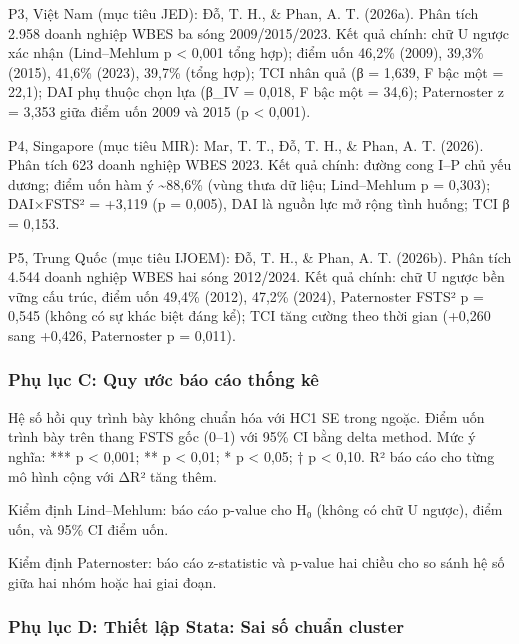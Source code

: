 \documentclass[
  a4paper,
  13pt]{extreport}
\begin{document}
P3, Việt Nam (mục tiêu JED): Đỗ, T. H., \& Phan, A. T. (2026a). Phân
tích 2.958 doanh nghiệp WBES ba sóng 2009/2015/2023. Kết quả chính: chữ
U ngược xác nhận (Lind--Mehlum p \textless{} 0,001 tổng hợp); điểm uốn
46,2\% (2009), 39,3\% (2015), 41,6\% (2023), 39,7\% (tổng hợp); TCI nhân
quả (β = 1,639, F bậc một = 22,1); DAI phụ thuộc chọn lựa (β\_IV =
0,018, F bậc một = 34,6); Paternoster z = 3,353 giữa điểm uốn 2009 và
2015 (p \textless{} 0,001).

P4, Singapore (mục tiêu MIR): Mar, T. T., Đỗ, T. H., \& Phan, A. T.
(2026). Phân tích 623 doanh nghiệp WBES 2023. Kết quả chính: đường cong
I--P chủ yếu dương; điểm uốn hàm ý \textasciitilde88,6\% (vùng thưa dữ
liệu; Lind--Mehlum p = 0,303); DAI×FSTS² = +3,119 (p = 0,005), DAI là
nguồn lực mở rộng tình huống; TCI β = 0,153.

P5, Trung Quốc (mục tiêu IJOEM): Đỗ, T. H., \& Phan, A. T. (2026b). Phân
tích 4.544 doanh nghiệp WBES hai sóng 2012/2024. Kết quả chính: chữ U
ngược bền vững cấu trúc, điểm uốn 49,4\% (2012), 47,2\% (2024),
Paternoster FSTS² p = 0,545 (không có sự khác biệt đáng kể); TCI tăng
cường theo thời gian (+0,260 sang +0,426, Paternoster p = 0,011).

\hypertarget{phux1ee5-lux1ee5c-c-quy-ux1b0ux1edbc-buxe1o-cuxe1o-thux1ed1ng-kuxea}{%
\subsubsection{Phụ lục C: Quy ước báo cáo thống
kê}\label{phux1ee5-lux1ee5c-c-quy-ux1b0ux1edbc-buxe1o-cuxe1o-thux1ed1ng-kuxea}}

Hệ số hồi quy trình bày không chuẩn hóa với HC1 SE trong ngoặc. Điểm uốn
trình bày trên thang FSTS gốc (0--1) với 95\% CI bằng delta method. Mức
ý nghĩa: *** p \textless{} 0,001; ** p \textless{} 0,01; * p \textless{}
0,05; † p \textless{} 0,10. R² báo cáo cho từng mô hình cộng với ΔR²
tăng thêm.

Kiểm định Lind--Mehlum: báo cáo p-value cho H₀ (không có chữ U ngược),
điểm uốn, và 95\% CI điểm uốn.

Kiểm định Paternoster: báo cáo z-statistic và p-value hai chiều cho so
sánh hệ số giữa hai nhóm hoặc hai giai đoạn.

\hypertarget{phux1ee5-lux1ee5c-d-thiux1ebft-lux1eadp-stata-sai-sux1ed1-chuux1ea9n-cluster}{%
\subsubsection{Phụ lục D: Thiết lập Stata: Sai số chuẩn
cluster}\label{phux1ee5-lux1ee5c-d-thiux1ebft-lux1eadp-stata-sai-sux1ed1-chuux1ea9n-cluster}}
\end{document}
